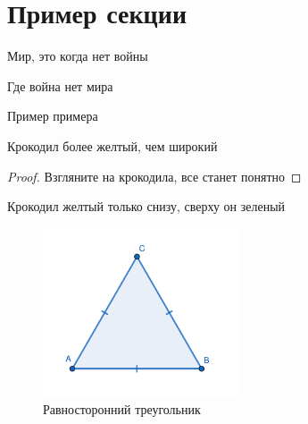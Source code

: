 \section{Пример секции}

\begin{definition}
	Мир, это когда нет войны
\end{definition}

\begin{corollary}
	Где война нет мира
\end{corollary}


\begin{example}
	Пример примера
\end{example}

\begin{theorem}[О крокодиле]
	Крокодил более желтый, чем широкий
\end{theorem}

\begin{proof}
	Взгляните на крокодила, все станет понятно
\end{proof}

\begin{remark}
	Крокодил желтый только снизу, сверху он зеленый
\end{remark}

\begin{figure}[h]
    \centering
    \includegraphics[height=5cm]{tex/chapter_1/assets/geogebra-export.pdf}
    \caption{Равносторонний треугольник}
\end{figure}
